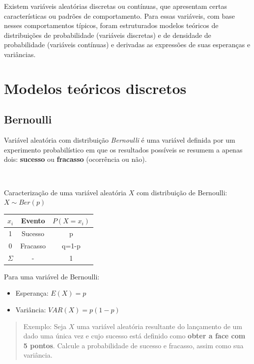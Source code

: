 \documentclass[
]{book}
\providecommand{\tightlist}{%
  \setlength{\itemsep}{0pt}\setlength{\parskip}{0pt}}
\begin{document}
Existem variáveis aleatórias discretas ou contínuas, que apresentam certas características ou padrões de comportamento. Para essas variáveis, com base nesses comportamentos típicos, foram estruturados modelos teóricos de distribuições de probabilidade (variáveis discretas) e de densidade de probabilidade (variáveis contínuas) e derivadas as expressões de suas esperanças e variâncias.

\hypertarget{modelos-teuxf3ricos-discretos}{%
\section{Modelos teóricos discretos}\label{modelos-teuxf3ricos-discretos}}

\hypertarget{bernoulli}{%
\subsection{Bernoulli}\label{bernoulli}}

Variável aleatória com distribuição \emph{Bernoulli} é uma variável definida por um experimento probabilístico em que os resultados possíveis se resumem a apenas dois: \textbf{sucesso} ou \textbf{fracasso} (ocorrência ou não).

~

Caracterização de uma variável aleatória \(X\) com distribuição de Bernoulli: \(X\sim Ber(p)\)

\begin{table}[h]
\centering
\begin{tabular}{|c|c|c|}
\hline 
$x_{i}$ & Evento & $P(X=x_{i})$ \\ 
\hline 
1 & Sucesso & p \\ 
\hline 
0 & Fracasso & q=1-p \\ 
\hline 
$\Sigma$ & - & 1 \\ 
\hline 
\end{tabular} 
\end{table}

\hfill\break

Para uma variável de Bernoulli:

\begin{itemize}
\tightlist
\item
  Esperança: \(E(X)=p\)\\
\item
  Variância: \(VAR(X)=p(1-p)\)
\end{itemize}

\hfill\break

\begin{quote}
Exemplo: Seja \(X\) uma variável aleatória resultante do lançamento de um dado uma única vez e cujo sucesso está definido como \textbf{obter a face com 5 pontos}. Calcule a probabilidade de sucesso e fracasso, assim como sua variância.
\end{quote}
\end{document}
